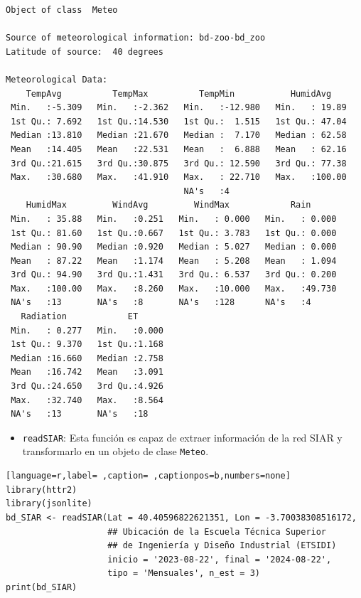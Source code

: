 \begin{verbatim}
Object of class  Meteo 

Source of meteorological information: bd-zoo-bd_zoo 
Latitude of source:  40 degrees

Meteorological Data:
    TempAvg          TempMax          TempMin           HumidAvg     
 Min.   :-5.309   Min.   :-2.362   Min.   :-12.980   Min.   : 19.89  
 1st Qu.: 7.692   1st Qu.:14.530   1st Qu.:  1.515   1st Qu.: 47.04  
 Median :13.810   Median :21.670   Median :  7.170   Median : 62.58  
 Mean   :14.405   Mean   :22.531   Mean   :  6.888   Mean   : 62.16  
 3rd Qu.:21.615   3rd Qu.:30.875   3rd Qu.: 12.590   3rd Qu.: 77.38  
 Max.   :30.680   Max.   :41.910   Max.   : 22.710   Max.   :100.00  
                                   NA's   :4                         
    HumidMax         WindAvg         WindMax            Rain       
 Min.   : 35.88   Min.   :0.251   Min.   : 0.000   Min.   : 0.000  
 1st Qu.: 81.60   1st Qu.:0.667   1st Qu.: 3.783   1st Qu.: 0.000  
 Median : 90.90   Median :0.920   Median : 5.027   Median : 0.000  
 Mean   : 87.22   Mean   :1.174   Mean   : 5.208   Mean   : 1.094  
 3rd Qu.: 94.90   3rd Qu.:1.431   3rd Qu.: 6.537   3rd Qu.: 0.200  
 Max.   :100.00   Max.   :8.260   Max.   :10.000   Max.   :49.730  
 NA's   :13       NA's   :8       NA's   :128      NA's   :4       
   Radiation            ET       
 Min.   : 0.277   Min.   :0.000  
 1st Qu.: 9.370   1st Qu.:1.168  
 Median :16.660   Median :2.758  
 Mean   :16.742   Mean   :3.091  
 3rd Qu.:24.650   3rd Qu.:4.926  
 Max.   :32.740   Max.   :8.564  
 NA's   :13       NA's   :18
\end{verbatim}

\begin{itemize}
\item \texttt{readSIAR}: Esta función es capaz de extraer información de la red SIAR y transformarlo en un objeto de clase \texttt{Meteo}.
\end{itemize}
\begin{lstlisting}[language=r,label= ,caption= ,captionpos=b,numbers=none]
library(httr2)
library(jsonlite)
bd_SIAR <- readSIAR(Lat = 40.40596822621351, Lon = -3.70038308516172,
                    ## Ubicación de la Escuela Técnica Superior
                    ## de Ingeniería y Diseño Industrial (ETSIDI)
                    inicio = '2023-08-22', final = '2024-08-22',
                    tipo = 'Mensuales', n_est = 3)
print(bd_SIAR)
\end{lstlisting}

